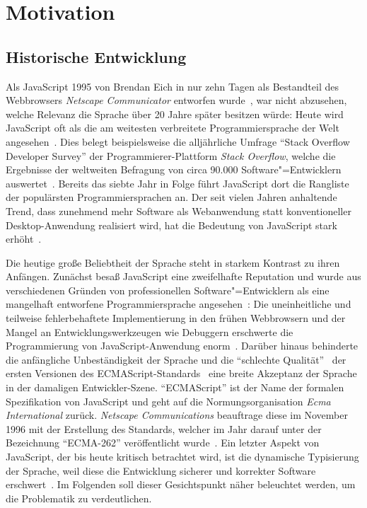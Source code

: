 \chapter{Motivation}
\label{chap:motiviation}

\section{Historische Entwicklung}

Als JavaScript 1995 von Brendan Eich in nur zehn Tagen als Bestandteil des Webbrowsers \textit{Netscape Communicator} entworfen wurde~\autocite{SEVERANCE:2012}, war nicht abzusehen, welche Relevanz die Sprache über 20 Jahre später besitzen würde: Heute wird JavaScript oft als die am weitesten verbreitete Programmiersprache der Welt angesehen~\autocite{PAULSON:2007,CROCKFORD:JS_POPULAR}. Dies belegt beispielsweise die alljährliche Umfrage \enquote{Stack Overflow Developer Survey} der Programmierer-Plattform \textit{Stack Overflow}, welche die Ergebnisse der weltweiten Befragung von circa 90.000 Software"=Entwicklern auswertet~\autocite{STACKOVERFLOW:SURVEY}. Bereits das siebte Jahr in Folge führt JavaScript dort die Rangliste der populärsten Programmiersprachen an. Der seit vielen Jahren anhaltende Trend, dass zunehmend mehr Software als Webanwendung statt konventioneller Desktop-Anwendung realisiert wird, hat die Bedeutung von JavaScript stark erhöht~\autocite{TAIVALSAARI:2017,CASTELEYN:2014}.

Die heutige große Beliebtheit der Sprache steht in starkem Kontrast zu ihren Anfängen. Zunächst besaß JavaScript eine zweifelhafte Reputation und wurde aus verschiedenen Gründen von professionellen Software"=Entwicklern als eine mangelhaft entworfene Programmiersprache angesehen~\autocite{CROCKFORD:JS_POPULAR}: Die uneinheitliche und teilweise fehlerbehaftete Implementierung in den frühen Webbrowsern und der Mangel an Entwicklungswerkzeugen wie Debuggern erschwerte die Programmierung von JavaScript-Anwendung enorm~\autocite{OREILLY:JS_HOW_DID_WE_GET_THERE}. Darüber hinaus behinderte die anfängliche Unbeständigkeit der Sprache und die \enquote{schlechte Qualität}~\autocite{CROCKFORD:JS_MISUNDERSTOOD} der ersten Versionen des ECMAScript-Standards~\autocite{ECMASCRIPT:1997} eine breite Akzeptanz der Sprache in der damaligen Entwickler-Szene. \enquote{ECMAScript} ist der Name der formalen Spezifikation von JavaScript und geht auf die Normungsorganisation \textit{Ecma International} zurück. \textit{Netscape Communications} beauftrage diese im November 1996 mit der Erstellung des Standards, welcher im Jahr darauf unter der Bezeichnung \enquote{ECMA-262} veröffentlicht wurde~\autocite{ECMASCRIPT:1997}. Ein letzter Aspekt von JavaScript, der bis heute kritisch betrachtet wird, ist die dynamische Typisierung der Sprache, weil diese die Entwicklung sicherer und korrekter Software erschwert~\autocite{NIKHIL:2014,PRADEL:2015}. Im Folgenden soll dieser Gesichtspunkt näher beleuchtet werden, um die Problematik zu verdeutlichen.

